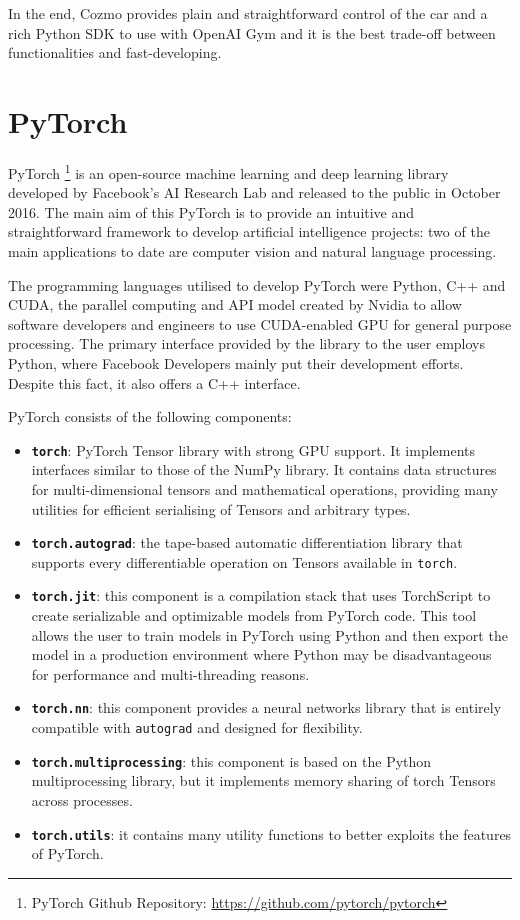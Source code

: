 In the end, Cozmo provides plain and straightforward control of the car and a rich Python SDK to use with OpenAI Gym and it is the best trade-off between functionalities and fast-developing. 


\section{PyTorch}
PyTorch \footnote{PyTorch Github Repository: \href{https://github.com/pytorch/pytorch}{https://github.com/pytorch/pytorch}} \cite{paszke2017automatic}  is an open-source machine learning and deep learning library developed by Facebook's AI Research Lab and released to the public in October 2016. The main aim of this PyTorch is to provide an intuitive and straightforward framework to develop artificial intelligence projects: two of the main applications to date are computer vision and natural language processing.

The programming languages utilised to develop PyTorch were Python, C++ and CUDA, the parallel computing and API model created by Nvidia to allow software developers and engineers to use CUDA-enabled GPU for general purpose processing. The primary interface provided by the library to the user employs Python, where Facebook Developers mainly put their development efforts. Despite this fact, it also offers a C++ interface. 

PyTorch consists of the following components:
\begin{itemize}
\item \textbf{\texttt{torch}}: PyTorch Tensor library with strong GPU support. It implements interfaces similar to those of the NumPy library. It contains data structures for multi-dimensional tensors and mathematical operations, providing many utilities for efficient serialising of Tensors and arbitrary types.
\item \textbf{\texttt{torch.autograd}}: the tape-based automatic differentiation library that supports every differentiable operation on Tensors available in \texttt{torch}. 
\item \textbf{\texttt{torch.jit}}: this component is a compilation stack that uses TorchScript to create serializable and optimizable models from PyTorch code. This tool allows the user to train models in PyTorch using Python and then export the model in a production environment where Python may be disadvantageous for performance and multi-threading reasons.
\item \textbf{\texttt{torch.nn}}: this component provides a neural networks library that is entirely compatible with \texttt{autograd} and designed for flexibility.
\item \textbf{\texttt{torch.multiprocessing}}: this component is based on the Python multiprocessing library, but it implements memory sharing of torch Tensors across processes.
\item \textbf{\texttt{torch.utils}}: it contains many utility functions to better exploits the features of PyTorch.
\end{itemize}

